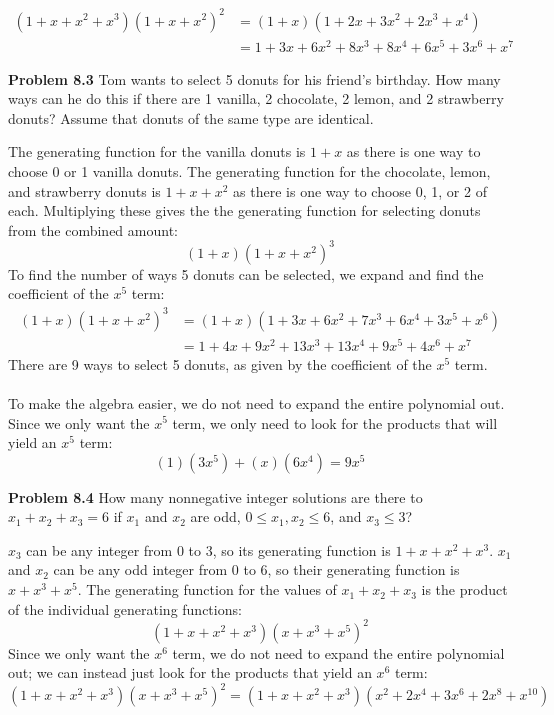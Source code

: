 \documentclass[11pt]{scrartcl}
\begin{document}
\begin{align*}
    (1+x+x^2+x^3)(1+x+x^2)^2 & = (1+x)(1+2x+3x^2+2x^3+x^4)\\
                             & = 1+3x+6x^2+8x^3+8x^4+6x^5+3x^6+x^7
\end{align*}
\begin{tcolorbox}
\textbf{Problem 8.3} Tom wants to select 5 donuts for his friend's birthday. How many ways can he do this if there are 1 vanilla, 2 chocolate, 2 lemon, and 2 strawberry donuts? Assume that donuts of the same type are identical. 
\end{tcolorbox}
\noindent 
The generating function for the vanilla donuts is $1+x$ as there is one way to choose 0 or 1 vanilla donuts. The generating function for the chocolate, lemon, and strawberry donuts is $1+x+x^2$ as there is one way to choose 0, 1, or 2 of each. Multiplying these gives the the generating function for selecting donuts from the combined amount: 
$$(1+x)(1+x+x^2)^3$$
To find the number of ways 5 donuts can be selected, we expand and find the coefficient of the $x^5$ term:
\begin{align*}
    (1+x)(1+x+x^2)^3 & = (1+x)(1+3x+6x^2+7x^3+6x^4+3x^5+x^6)\\
                             & = 1+4x+9x^2+13x^3+13x^4+9x^5+4x^6+x^7
\end{align*}
There are 9 ways to select 5 donuts, as given by the coefficient of the $x^5$ term. \\
\\
\noindent 
To make the algebra easier, we do not need to expand the entire polynomial out. Since we only want the $x^5$ term, we only need to look for the products that will yield an $x^5$ term: 
$$(1)(3x^5)+(x)(6x^4)=9x^5$$
\begin{tcolorbox}
\textbf{Problem 8.4} How many nonnegative integer solutions are there to $x_1+x_2+x_3=6$ if $x_1$ and $x_2$ are odd, $0 \leq {x_1}, {x_2} \leq 6$, and $x_3\leq3$?
\end{tcolorbox}
\noindent 
$x_3$ can be any integer from 0 to 3, so its generating function is $1+x+x^2+x^3$. $x_1$ and $x_2$ can be any odd integer from 0 to 6, so their generating function is $x+x^3+x^5$. The generating function for the values of ${x_1}+{x_2}+{x_3}$ is the product of the individual generating functions: 
$$(1+x+x^2+x^3)(x+x^3+x^5)^2$$
Since we only want the $x^6$ term, we do not need to expand the entire polynomial out; we can instead just look for the products that yield an $x^6$ term: 
$$(1+x+x^2+x^3)(x+x^3+x^5)^2=(1+x+x^2+x^3)(x^2+2x^4+3x^6+2x^8+x^{10})$$
\end{document}
